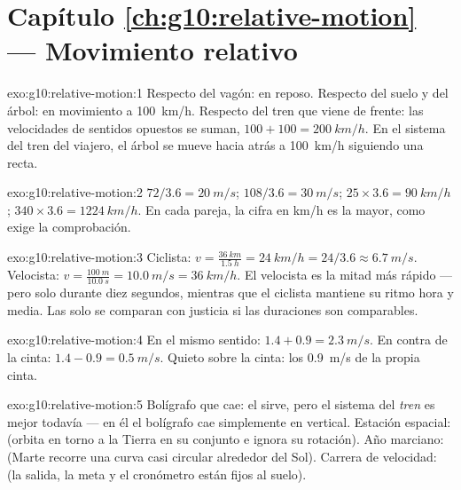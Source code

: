 \section*{Capítulo \ref{ch:g10:relative-motion} --- Movimiento relativo}

\begin{solution}{exo:g10:relative-motion:1}
Respecto del vagón: en reposo. Respecto del suelo y del árbol: en
movimiento a \qty{100}{km/h}. Respecto del tren que viene de frente: las
velocidades de sentidos opuestos se suman,
$100 + 100 = \qty{200}{km/h}$. En el sistema del tren del viajero, el
árbol se mueve hacia atrás a \qty{100}{km/h} siguiendo una recta.
\end{solution}

\begin{solution}{exo:g10:relative-motion:2}
$72 / 3.6 = \qty{20}{m/s}$; $108 / 3.6 = \qty{30}{m/s}$;
$25 \times 3.6 = \qty{90}{km/h}$; $340 \times 3.6 = \qty{1224}{km/h}$.
En cada pareja, la cifra en \unit{km/h} es la mayor, como exige la
comprobación.
\end{solution}

\begin{solution}{exo:g10:relative-motion:3}
Ciclista: $v = \frac{\qty{36}{km}}{\qty{1.5}{h}} = \qty{24}{km/h}
= 24/3.6 \approx \qty{6.7}{m/s}$. Velocista:
$v = \frac{\qty{100}{m}}{\qty{10.0}{s}} = \qty{10.0}{m/s}
= \qty{36}{km/h}$. El velocista es la mitad más rápido --- pero solo
durante diez segundos, mientras que el ciclista mantiene su ritmo hora y
media. Las  solo se comparan con justicia si las
duraciones son comparables.
\end{solution}

\begin{solution}{exo:g10:relative-motion:4}
En el mismo sentido: $1.4 + 0.9 = \qty{2.3}{m/s}$. En contra de la
cinta: $1.4 - 0.9 = \qty{0.5}{m/s}$. Quieto sobre la cinta: los
\qty{0.9}{m/s} de la propia cinta.
\end{solution}

\begin{solution}{exo:g10:relative-motion:5}
Bolígrafo que cae: el  sirve, pero el sistema del
\emph{tren} es mejor todavía --- en él el bolígrafo cae simplemente en
vertical. Estación espacial:  (orbita en torno a la
Tierra en su conjunto e ignora su rotación). Año marciano:  (Marte recorre una curva casi circular alrededor del Sol).
Carrera de velocidad:  (la salida, la meta y el
cronómetro están fijos al suelo).
\end{solution}

